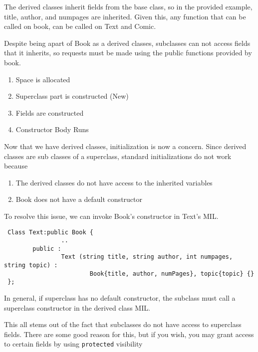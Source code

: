 \documentclass{article}
\newenvironment{ablock}[1]{%
    \tcolorbox[beamer,%
    noparskip,breakable,
    colback=lightcoral,colframe=darkred,%
    colbacklower=tomato!75!lightcoral,%
    title=#1]}%
    {\endtcolorbox}
\begin{document}
 The derived classes inherit fields from the base class, so in the provided example, title, author, and numpages are inherited. Given this, any function that can be called on book, can be called on Text and Comic. 
 
 Despite being apart of Book as a derived classes, subclasses can not access fields that it inherits, so requests must be made using the public functions provided by book. 
 
 \begin{ablock} {What Happens when a object is constructed with derived classes}
 \begin{enumerate}
 \item Space is allocated 
 \item Superclass part is constructed  (New) 
 \item Fields are constructed 
 \item Constructor Body Runs 
 \end{enumerate}
 \end{ablock}
   
  \newpage 
  
 Now that we have derived classes, initialization is now a concern. Since derived classes are sub classes of a superclass, standard initializations do not work because 

 \begin{enumerate}
 \item The derived classes do not have access to the inherited variables 
 \item Book does not have a default constructor 
 \end{enumerate}
 
 To resolve this issue, we can invoke Book's constructor in Text's MIL.
 
 \begin{lstlisting}
 Class Text:public Book {
 				..
 		public : 
 				Text (string title, string author, int numpages, string topic) :
 						Book{title, author, numPages}, topic{topic} {}
 };
 \end{lstlisting}
 
 In general, if superclass has no default constructor, the subclass must call a superclass constructor in the derived class MIL. 
 
 This all stems out of the fact that subclasses do not have access to superclass fields. There are some good reason for this, but if you wish, you may grant access to certain fields by using \verb|protected| visibility
 
\end{document}
